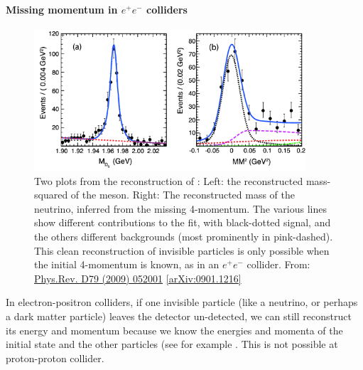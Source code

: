 \paragraph{Missing momentum in $e^+ e^-$ colliders}
\begin{figure}
\centering
\includegraphics[width=0.9\textwidth]{fig/CLEO_Ds2munu}
\caption{Two plots from the reconstruction of : Left: the reconstructed mass-squared of the  meson. Right: The reconstructed mass of the neutrino, inferred from the missing 4-momentum. The various lines show different contributions to the fit, with black-dotted signal, and the others different backgrounds (most prominently  in pink-dashed). This clean reconstruction of invisible particles is only possible when the initial 4-momentum is known, as in an $e^+ e^-$ collider.
From: \href{https://inspirehep.net/record/810661/}{Phys.Rev. D79 (2009) 052001} \href{https://inspirehep.net/record/810661/}{[arXiv:0901.1216]}
\label{fig:CLEO_Ds2munu}}
\end{figure}

In electron-positron colliders, if one invisible particle (like a neutrino, or perhaps a dark matter particle) leaves the detector un-detected, we can still reconstruct its energy and momentum because we know the energies and momenta of the initial state and the other particles (see for example . This is not possible at proton-proton collider. 

